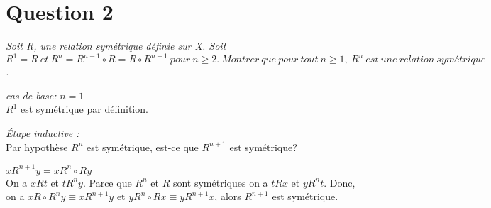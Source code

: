 \section*{Question 2}
\emph{Soit R, une relation symétrique définie sur X. Soit $R^1 = R\ et\ R^n = R^{n-1} \circ R = R \circ R^{n-1}\ pour\ n \geq 2.\ Montrer\ que\ pour\ tout\ n\geq1,\ R^n\ est\ une\ relation\ symétrique$.}

\bigskip

\emph{cas de base: }
$n = 1$\\
$R^1$ est symétrique par définition.

\bigskip

\emph{Étape inductive : }\\
Par hypothèse $R^n$ est symétrique, est-ce que $R^{n+1}$ est symétrique?
\bigskip

$xR^{n+1}y = xR^n \circ Ry$\\
On a $xRt$ et $tR^ny$. Parce que $R^n$ et $R$ sont symétriques on a $tRx$ et $yR^nt$. Donc, on a $xR \circ R^ny \equiv xR^{n+1}y$ et $yR^n \circ Rx \equiv yR^{n+1}x$, alors $R^{n+1}$ est symétrique.